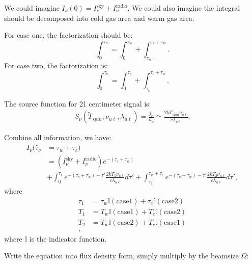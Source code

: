 \documentclass[12pt,letterpaper]{article}
\newcommand{\Isky}{I_\nu^{\textrm{sky}}}
\newcommand{\Iradio}{I_\nu^{\textrm{radio}}}
\newcommand{\indicator}{\mathbb{I}}
\begin{document}
We could imagine $I_\nu(0) = \Isky + \Iradio$.
We could also imagine the integral should be decomposed into cold gas area and warm gas area.

For case one, the factorization should be:
\begin{equation*}
    \int_0^{\tau_\nu} = \int_0^{\tau_w} + \int_{\tau_w}^{\tau_c + \tau_w}.
\end{equation*}
For case two, the factorization is:
\begin{equation*}
    \int_0^{\tau_\nu} = \int_0^{\tau_c} + \int_{\tau_c}^{\tau_c + \tau_w}.
\end{equation*}

The source function for 21 centimeter signal is:
\begin{equation}
    \begin{split}
        S_\nu(\tilde{T}_{spin}, \nu_{u \ell}, \lambda_{u \ell}) = \frac{j_\nu}{\kappa_\nu}
        \simeq \frac{2 k T_{spin} \nu_{u \ell}}{c \lambda_{u \ell}}.            
    \end{split}
\end{equation}

Combine all information, we have:
\begin{equation}
    \begin{split}
        I_{\nu}(\tilde{\tau_\nu} &= \tau_w + \tau_c)\\
        &= (\Isky + \Iradio)e^{-(\tau_c + \tau_w)}\\
        &+ 
        \int_0^{\tau_1} e^{-(\tau_c + \tau_w) - \tau'} 
        \frac{2 k T_{1} \nu_{u \ell}}{c \lambda_{u \ell}} d\tau'
        + 
        \int_{\tau_1}^{\tau_w + \tau_c} e^{-(\tau_c + \tau_w) - \tau'} 
        \frac{2 k T_{2} \nu_{u \ell}}{c \lambda_{u \ell}} d\tau',
    \end{split}
\end{equation}
where
\begin{equation}
    \begin{split}
        \tau_1 &= \tau_w \indicator(\textrm{case1}) + \tau_c \indicator(\textrm{case2})\\
        T_1 &= T_w \indicator(\textrm{case1}) + T_c \indicator(\textrm{case2})\\
        T_2 &= T_w \indicator(\textrm{case2}) + T_c \indicator(\textrm{case1})\\,
    \end{split}
\end{equation}
where $\indicator$ is the indicator function.

Write the equation into flux density form, simply multiply by the beamsize $\Omega$:
\end{document}
